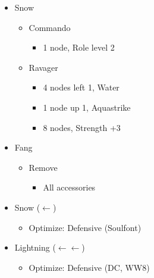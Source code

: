 \begin{multicols}{2}
\begin{menu}
\begin{itemize}
\begin{itemize}
              \begin{itemize}
                \item Commando
                      \begin{itemize}
                        \item 3 nodes left 2, Quake
                      \end{itemize}
              \end{itemize}
        \item Snow
              \begin{itemize}
                \item Commando
                      \begin{itemize}
                        \item 1 node, Role level 2
                      \end{itemize}
                \item Ravager
                      \begin{itemize}
                        \item 4 nodes left 1, Water
                        \item 1 node up 1, Aquastrike
                        \item 8 nodes, Strength +3
                      \end{itemize}
              \end{itemize}
      \end{itemize}
      \equip
      \begin{itemize}
        \item Fang
              \begin{itemize}
                \item Remove
                      \begin{itemize}
                        \item All accessories
                      \end{itemize}
              \end{itemize}
        \item Snow ($\leftarrow$)
              \begin{itemize}
                \item Optimize: Defensive (Soulfont)
              \end{itemize}
        \item Lightning ($\leftarrow\leftarrow$)
              \begin{itemize}
                \item Optimize: Defensive (DC, WW8)

\end{itemize}
\end{itemize}
\end{itemize}
\end{menu}
\end{multicols}
